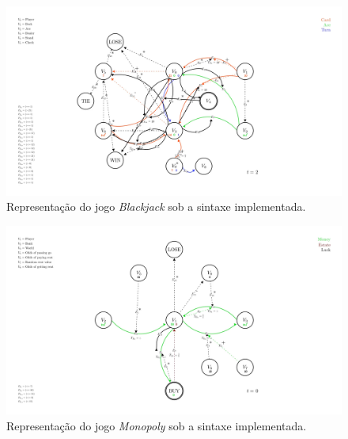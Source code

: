 \documentclass[aspectratio=169]{beamer}
\begin{document}
\begin{frame}
\begin{figure}[h!]
    \centering
    \includegraphics[width=0.9\linewidth]{figures/Blackjack.png}
    \caption{Representação do jogo \textit{Blackjack} sob a sintaxe implementada.}
    \label{fig:blackjack}
\end{figure}
\end{frame}

\begin{frame}
\begin{figure}[h!]
    \centering
    \includegraphics[width=0.9\linewidth]{figures/Monopoly.png}
    \caption{Representação do jogo \textit{Monopoly} sob a sintaxe implementada.}
    \label{fig:my-monopoly}
\end{figure}
\end{frame}
\end{document}
